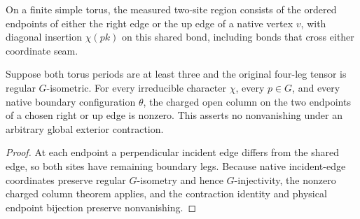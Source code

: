 \begin{definition}
    \label{def:peps_torus_edge_physical_charge_measurement}
    \leanok
    On a finite simple torus, the measured two-site region consists of the
    ordered endpoints of either the right edge or the up edge of a native
    vertex $v$, with diagonal insertion $\chi(pk)$ on this shared bond,
    including bonds that cross either coordinate seam.
\end{definition}

\begin{lemma}
    \label{thm:peps_torus_edge_charge_nonzero}
    \leanok
    Suppose both torus periods are at least three and the original four-leg tensor
    is regular $G$-isometric. For every irreducible character $\chi$, every
    $p\in G$, and every native boundary configuration $\theta$, the charged
    open column on the two endpoints of a chosen right or up edge is nonzero.
    This asserts no nonvanishing under an arbitrary global exterior contraction.
\end{lemma}
\begin{proof}\leanok
    At each endpoint a perpendicular incident edge differs from the shared edge,
    so both sites have remaining boundary legs. Because native incident-edge
    coordinates preserve regular $G$-isometry and hence $G$-injectivity, the
    nonzero charged column theorem applies, and the contraction identity and
    physical endpoint bijection preserve nonvanishing.
\end{proof}

